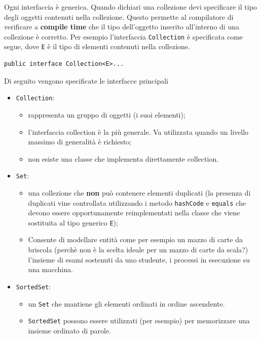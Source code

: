 \documentclass{article}
\begin{document}
Ogni interfaccia \`e generica. Quando dichiari una collezione devi specificare il tipo degli oggetti contenuti nella collezione. Questo permette al compilatore di verificare a \textbf{compile time} che il tipo dell'oggetto inserito all'interno di una collezione \`e corretto. Per esempio l'interfaccia \texttt{Collection} \`e specificata come segue, dove \texttt{E} \`e il tipo di elementi contenuti nella collezione.
\begin{lstlisting}
public interface Collection<E>...
\end{lstlisting}
Di seguito vengono specificate le interfacce principali
\begin{itemize}
\item \texttt{Collection}: 
\begin{itemize}
\item rappresenta un gruppo di oggetti (i suoi elementi);
\item l'interfaccia collection \`e la pi\`u generale. Va utilizzata quando un livello massimo di generalit\`a \`e richiesto;
\item non esiste una classe che implementa direttamente collection. 
\end{itemize}
\item \texttt{Set}: 
\begin{itemize}
\item una collezione che \textbf{non} pu\`o contenere elementi duplicati (la presenza di duplicati vine controllata utilizzando i metodo \texttt{hashCode} e \texttt{equals} che devono essere opportunamente reimplementati nella classe che viene sostituita al tipo generico \texttt{E}); 
\item Consente di modellare entit\`a come per esempio un mazzo di carte da briscola (perch\`e non \`e la scelta ideale per un mazzo di carte da scala?) l'insieme di esami sostenuti da uno studente, i processi in esecuzione su una macchina.
\end{itemize} 
\item \texttt{SortedSet}: 
\begin{itemize}
\item un \texttt{Set} che mantiene gli elementi ordinati in ordine ascendente.  
\item \texttt{SortedSet} possono essere utilizzati (per esempio) per memorizzare una insieme ordinato di parole.
\end{itemize}
\end{itemize}
\end{document}
